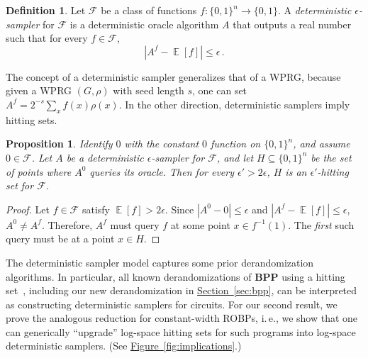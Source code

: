 \documentclass[11pt]{article}
\numberwithin{equation}{section}
\newtheorem{proposition}[theorem]{Proposition}
\theoremstyle{definition}
\newtheorem{definition}[theorem]{Definition}
\theoremstyle{plain}
\newcommand{\ie}{i.\,e.}
\newcommand{\expref}[2]{\hyperref[#2]{#1~\ref{#2}}}
\DeclareMathOperator*{\ExpVal}{\mathbb{E}}
\begin{document}
\begin{definition}
Let $\mathcal{F}$ be a class of functions $f \colon \{0, 1\}^n \to \{0, 1\}$. A \emph{deterministic $\epsilon$-sampler} for $\mathcal{F}$ is a deterministic oracle algorithm $A$ that outputs a real number such that for every $f \in \mathcal{F}$,
$$
|A^f - \ExpVal[f]| \leq \epsilon\,.
$$
\end{definition}

The concept of a deterministic sampler generalizes that of a WPRG, because given a WPRG $(G, \rho)$ with seed length $s$, one can set $A^f = 2^{-s} \sum_x f(x) \rho(x)$. In the other direction, deterministic samplers imply hitting sets.

\begin{proposition}
Identify $0$ with the constant $0$ function on $\{0, 1\}^n$, and assume $0 \in \mathcal{F}$. Let $A$ be a deterministic $\epsilon$-sampler for $\mathcal{F}$, and let $H \subseteq \{0, 1\}^n$ be the set of points where $A^0$ queries its oracle. Then for every $\epsilon' > 2\epsilon$, $H$ is an $\epsilon'$-hitting set for $\mathcal{F}$.
\end{proposition}

\begin{proof}
Let $f \in \mathcal{F}$ satisfy $\ExpVal[f] > 2\epsilon$. Since $|A^0 - 0| \leq \epsilon$ and $|A^f - \ExpVal[f]| \leq \epsilon$, $A^0 \neq A^f$. Therefore, $A^f$ must query $f$ at some point $x \in f^{-1}(1)$. The \emph{first} such query must be at a point $x \in H$.
\end{proof}

The deterministic sampler model captures some prior derandomization algorithms. In particular, all known derandomizations of $\mathbf{BPP}$ using a hitting set~\cite{ACR98,BF99,ACRT99,GVW11}, including our new derandomization in \expref{Section}{sec:bpp}, can be interpreted as constructing deterministic samplers for circuits. For our second result, we prove the analogous reduction for constant-width ROBPs, \ie, we show that one can generically ``upgrade'' log-space hitting sets for such programs into log-space deterministic samplers. (See \expref{Figure}{fig:implications}.)
\end{document}
